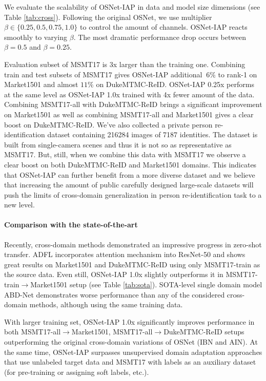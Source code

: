 \documentclass[a4paper,conference]{IEEEtran}
\begin{document}
We evaluate the scalability of OSNet-IAP in data and model size dimensions (see
Table \ref{tab:cross}).  Following the original OSNet, we use multiplier
$\beta\in\{0.25,0.5,0.75,1.0\}$ to control the amount of channels. OSNet-IAP
reacts smoothly to varying $\beta$. The most dramatic performance drop occurs
between $\beta=0.5$ and $\beta=0.25$.

Evaluation subset of MSMT17 is 3x larger than the training one. Combining train
and test subsets of MSMT17 gives OSNet-IAP additional $~6\%$ to rank-1 on
Market1501 and almost $11\%$ on DukeMTMC-ReID. OSNet-IAP 0.25x performs at the
same level as OSNet-IAP 1.0x trained with 4x fewer amount of the data. Combining
MSMT17-all with DukeMTMC-ReID brings a significant improvement on Market1501 as
well as combining MSMT17-all and Market1501 gives a clear boost on
DukeMTMC-ReID. We've also collected a private person re-identification dataset
containing 216284 images of 7187 identities. The dataset is built from
single-camera scenes and thus it is not so as representative as MSMT17. But,
still, when we combine this data with MSMT17 we observe a clear boost on both
DukeMTMC-ReID and Market1501 domains. This indicates that OSNet-IAP can further
benefit from a more diverse dataset and we believe that increasing the amount
of public carefully designed large-scale datasets will push the limits of cross-domain
generalization in person re-identification task to a new level.

\paragraph{Comparison with the state-of-the-art}\label{para:compare_sota}

Recently, cross-domain methods demonstrated an impressive progress in zero-shot
transfer. ADFL \cite{Liu2019AttentionAB} incorporates attention mechanism into ResNet-50 and
shows great results on Market1501 and DukeMTMC-ReID using only MSMT17-train as the source data. Even still,
OSNet-IAP 1.0x slightly outperforms it in MSMT17-train$\rightarrow$Market1501
setup (see Table \ref{tab:sota}). SOTA-level single domain model
ABD-Net \cite{abd} demonstrates worse performance than any of the considered cross-domain methods,
although using the same training data.

With larger training set, OSNet-IAP 1.0x significantly improves performance in
both MSMT17-all$\rightarrow$Market1501, MSMT17-all$\rightarrow$DukeMTMC-ReID
setups outperforming the original cross-domain variations of OSNet (IBN and
AIN).  At the same time, OSNet-IAP surpasses unsupervised domain adaptation
approaches that use unlabeled target data and MSMT17 with labels as an auxiliary
dataset (for pre-training or assigning soft labels, etc.).
\end{document}
